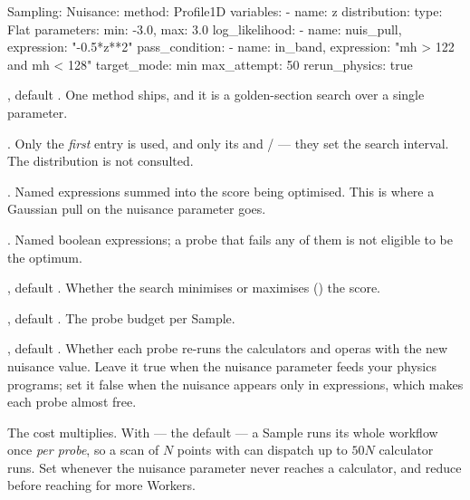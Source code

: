 \begin{yamlwin}
Sampling:
  Nuisance:
    method: Profile1D
    variables:
      - name: z
        distribution:
          type: Flat
          parameters: {min: -3.0, max: 3.0}
    log_likelihood:
      - {name: nuis_pull, expression: "-0.5*z**2"}
    pass_condition:
      - {name: in_band, expression: "mh > 122 and mh < 128"}
    target_mode: min
    max_attempt: 50
    rerun_physics: true
\end{yamlwin}

\begin{keylist}
  \item[method] \opt, default . One method ships, and it is a
        golden-section search over a single parameter.
  \item[variables] \req. Only the \emph{first} entry is used, and only its
         and / --- they set the search
        interval. The distribution  is not consulted.
  \item[log\_likelihood] \opt. Named expressions summed into the score being optimised.
        This is where a Gaussian pull on the nuisance parameter goes.
  \item[pass\_condition] \opt. Named boolean expressions; a probe that fails any of them
        is not eligible to be the optimum.
  \item[target\_mode] \opt, default . Whether the search minimises or
        maximises () the score.
  \item[max\_attempt] \opt, default . The probe budget per Sample.
  \item[rerun\_physics] \opt, default . Whether each probe re-runs the
        calculators and operas with the new nuisance value. Leave it true when the
        nuisance parameter feeds your physics programs; set it false when the nuisance
        appears only in expressions, which makes each probe almost free.
\end{keylist}

\begin{jwarn}
The cost multiplies. With  --- the default --- a Sample
runs its whole workflow once \emph{per probe}, so a scan of $N$ points with
 can dispatch up to $50N$ calculator runs. Set
 whenever the nuisance parameter never reaches a
calculator, and reduce  before reaching for more Workers.
\end{jwarn}

